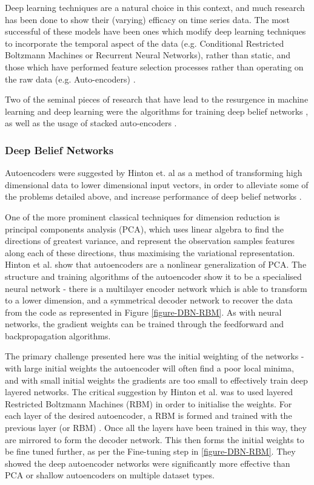 \documentclass[a4paper,11pt,oneside]{article}
\theoremstyle{plain}
\theoremstyle{definition}
\begin{document}
	Deep learning techniques are a natural choice in this context, and much research has been done to show their 
	(varying) efficacy on time series data. The most successful of these models have been ones which modify deep 
	learning techniques to incorporate the temporal aspect of the data (e.g. Conditional Restricted Boltzmann 
	Machines or Recurrent Neural Networks), rather than static, and those which have performed feature selection
	processes rather than operating on the raw data (e.g. Auto-encoders)  \cite{Langkvist}. 
	\hfill \break 
	
	
	Two of the seminal pieces of research that have lead to the resurgence in machine learning and deep learning 
	were the algorithms for training deep belief networks \cite{Hinton1}, as well as the usage of stacked auto-encoders
	\cite{Ranzato1, Bengio1}. 
	
	
	\subsubsection{Deep Belief Networks}\label{DBN}
	
	Autoencoders were suggested by Hinton et. al as a method of transforming high dimensional 
	data to lower dimensional input vectors, in order to alleviate some of the problems detailed above, and increase 
	performance of deep belief networks \cite{Hinton2}.
	\hfill \break 
	
	One of the more prominent classical techniques for dimension reduction is principal components analysis (PCA), 
	which uses linear algebra to find the directions of greatest variance, and represent the observation samples 
	features along each of these directions, thus maximising the variational representation. Hinton et al. show that 
	autoencoders are a nonlinear generalization of PCA. The structure and training algorithms of the autoencoder 
	show it to be a specialised neural network - there is a multilayer encoder network which is able to transform to a 
	lower dimension, and a symmetrical decoder network to recover the data from the code as represented in Figure \ref{figure-DBN-RBM}. As with 
	neural networks, the gradient weights can be trained through the feedforward and backpropagation algorithms.  
	\hfill \break 
	
	The primary challenge presented here was the initial weighting of the networks - with large initial weights the 
	autoencoder will often find a poor local minima, and with small initial weights the gradients are too small to 
	effectively train deep layered networks. The critical suggestion by Hinton et al. was to used layered Restricted 
	Boltzmann Machines (RBM) in order to initialise the weights. For each layer of the desired autoencoder, a RBM is 
	formed and trained with the previous layer (or RBM) \cite{Hinton3}. Once all the layers have been 
	trained in this way, they are mirrored to form the decoder network. This then forms the initial weights to be fine 
	tuned further, as per the Fine-tuning step in \ref{figure-DBN-RBM}. They showed the deep autoencoder networks were significantly more 
	effective than PCA or shallow autoencoders on multiple dataset types. 
	\hfill \break 
	
\end{document}
